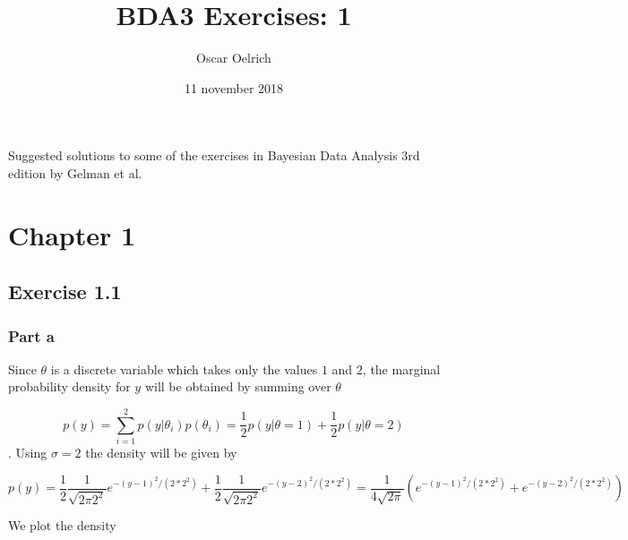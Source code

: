 \documentclass[]{article}
\title{BDA3 Exercises: 1}
\author{Oscar Oelrich}
\date{11 november 2018}
\begin{document}
\maketitle

Suggested solutions to some of the exercises in Bayesian Data Analysis
3rd edition by Gelman et al.

\section{Chapter 1}\label{chapter-1}

\subsection{Exercise 1.1}\label{exercise-1.1}

\subsubsection{Part a}\label{part-a}

Since \(\theta\) is a discrete variable which takes only the values
\(1\) and \(2\), the marginal probability density for \(y\) will be
obtained by summing over \(\theta\)

\[\begin{equation}
p(y) = \sum_{i=1}^2 p(y|\theta_i) p(\theta_i) = \frac{1}{2}p(y|\theta=1)+\frac{1}{2}p(y|\theta=2)
\end{equation}\] . Using \(\sigma=2\) the density will be given by

\[\begin{equation}
p(y)=\frac{1}{2} \frac{1}{\sqrt{2\pi 2^2}}e^{-(y-1)^2/(2*2^2)}   + \frac{1}{2}\frac{1}{\sqrt{2\pi 2^2}}e^{-(y-2)^2/(2*2^2)}= \frac{1}{4\sqrt{2\pi}}\left(e^{-(y-1)^2/(2*2^2)}+e^{-(y-2)^2/(2*2^2)}\right)
\end{equation}\]

We plot the density
\end{document}
